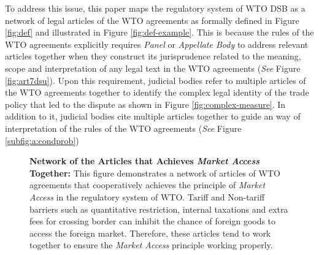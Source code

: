 To address this issue,
this paper maps
the regulatory system of WTO DSB
as a network of legal articles
of the WTO agreements as formally defined in Figure \ref{fig:def} and illustrated in Figure \ref{fig:def-example}. This is because the rules of the WTO agreements
explicitly requires \textit{Panel} or \textit{Appellate Body} to address
relevant articles together when they construct its jurisprudence related to the meaning, scope and interpretation of any legal text in the WTO agreements (\textit{See} Figure \ref{fig:art7dsu}).
Upon this requirement, judicial bodies refer to
multiple articles of the WTO agreements together
to identify the complex legal identity of the trade policy that led to the dispute as shown in Figure \ref{fig:complex-measure}.
In addition to it, judicial bodies cite multiple articles together
to guide an way of interpretation of the rules of the WTO agreements (\textit{See} Figure \ref{subfig:a:condprob})

\begin{figure}
    \centering{
        
    }
    \caption{{\bf Network of the Articles that Achieves \textit{Market Access} Together:}
        This figure demonstrates a network of articles of WTO agreements
        that cooperatively achieves the principle of \textit{Market Access} in the regulatory system of WTO.
        Tariff and Non-tariff barriers such as quantitative restriction, internal taxations
        and extra fees for crossing border can inhibit the chance of foreign goods to access the foreign market.
        Therefore, these articles tend to work together to ensure the \textit{Market Access} principle working properly.
    }
    \label{fig:market-aceess_directed}
\end{figure}

